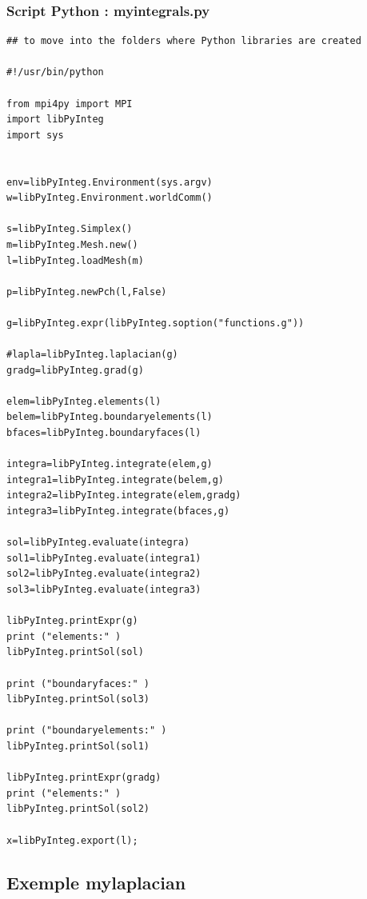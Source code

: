 \documentclass[french,12pt]{article}
\begin{document}
\subsubsection{Script Python : myintegrals.py}
\begin{lstlisting}
## to move into the folders where Python libraries are created

#!/usr/bin/python

from mpi4py import MPI
import libPyInteg
import sys


env=libPyInteg.Environment(sys.argv)
w=libPyInteg.Environment.worldComm()

s=libPyInteg.Simplex()
m=libPyInteg.Mesh.new()
l=libPyInteg.loadMesh(m)

p=libPyInteg.newPch(l,False)

g=libPyInteg.expr(libPyInteg.soption("functions.g"))

#lapla=libPyInteg.laplacian(g)
gradg=libPyInteg.grad(g)

elem=libPyInteg.elements(l)
belem=libPyInteg.boundaryelements(l)
bfaces=libPyInteg.boundaryfaces(l)

integra=libPyInteg.integrate(elem,g)
integra1=libPyInteg.integrate(belem,g)
integra2=libPyInteg.integrate(elem,gradg)
integra3=libPyInteg.integrate(bfaces,g)

sol=libPyInteg.evaluate(integra)
sol1=libPyInteg.evaluate(integra1)
sol2=libPyInteg.evaluate(integra2)
sol3=libPyInteg.evaluate(integra3)

libPyInteg.printExpr(g)
print ("elements:" ) 
libPyInteg.printSol(sol)

print ("boundaryfaces:" ) 
libPyInteg.printSol(sol3)

print ("boundaryelements:" ) 
libPyInteg.printSol(sol1)

libPyInteg.printExpr(gradg)
print ("elements:" ) 
libPyInteg.printSol(sol2)

x=libPyInteg.export(l);
\end{lstlisting}

\subsection{Exemple mylaplacian}
\end{document}
